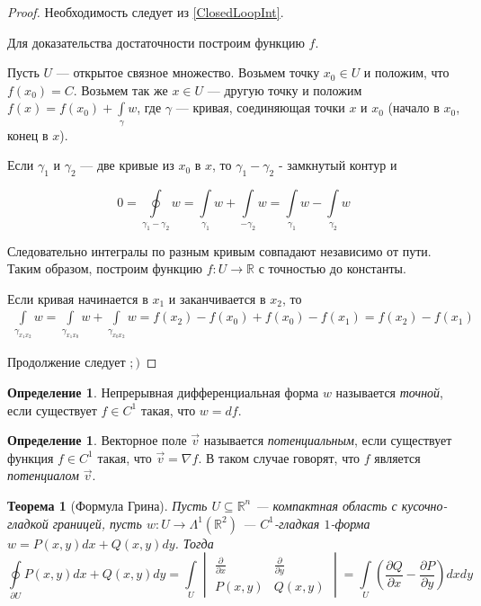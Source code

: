 \documentclass[a5paper]{article}
\newcounter{through}
\theoremstyle{plain}
\newtheorem{theorem}[through]{Теорема}
\theoremstyle{definition}
\newtheorem{definition}[through]{Определение}
\numberwithin{through}{section}
\numberwithin{equation}{section}
\begin{document}
\begin{proof}
	Необходимость следует из \ref{ClosedLoopInt}.
	
	Для доказательства достаточности построим функцию $f$. 
	
	Пусть $U$ --- открытое связное множество. Возьмем точку $x_0 \in U$ и положим, что $f(x_0)=C$. Возьмем так же $x \in U$ --- другую точку и положим $f(x)=f(x_0)+\int\limits_{\gamma} w$, где $\gamma$ --- кривая, соединяющая точки $x$ и $x_0$ (начало в $x_0$, конец в $x$). 
	
	Если $\gamma_1$ и $\gamma_2$ --- две кривые из $x_0$ в $x$, то $\gamma_1 - \gamma_2$ - замкнутый контур и 
	
	\begin{equation*}
		0 = \oint\limits_{\gamma_1 - \gamma_2}w = \int\limits_{\gamma_1} w + \int\limits_{-\gamma_2} w = \int\limits_{\gamma_1} w - \int\limits_{\gamma_2} w
	\end{equation*}
	
	Следовательно интегралы по разным кривым совпадают независимо от пути. Таким образом, построим
	функцию $f: U \to \mathbb{R}$ с точностью до константы.
	
	Если кривая начинается в $x_1$ и заканчивается в $x_2$, то
	\begin{eqnarray}\nonumber
		\int\limits_{\gamma_{x_1x_2}} w = \int\limits_{\gamma_{x_1x_0}} w + \int\limits_{\gamma_{x_0x_2}} w 
		= f(x_2)  - f(x_0) + f(x_0) - f(x_1)= f(x_2) - f(x_1)
	\end{eqnarray}
	
	Продолжение следует $;)$
\end{proof}


\begin{definition}
	Непрерывная дифференциальная форма $w$ называется \textit{точной}, если существует
	$f \in C^1$ такая, что $ w = df$.
\end{definition}

\begin{definition}
	Векторное поле $\vec{v}$ называется \textit{потенциальным}, если существует функция $f \in C^1$ 
	такая, что $\vec{v} = \nabla f$. В таком случае говорят, что $f$ является \textit{потенциалом}
	$\vec{v}$.
\end{definition}


\begin{theorem}[Формула Грина]
	Пусть $U \subseteq \mathbb{R}^n$ --- компактная область с кусочно-гладкой границей,
	пусть $w: U \to \Lambda^1(\mathbb{R}^2)$ --- $C^1$-гладкая $1$-форма $w = P(x,y)dx + Q(x,y)dy$. Тогда 
	\[ \oint\limits_{\partial U} P(x,y)dx + Q(x,y)dy = \int\limits_{U} 
	\begin{vmatrix}
	\frac{\partial}{\partial x} & \frac{\partial}{\partial y} \\
	P(x,y) & Q(x,y)
	\end{vmatrix} 
	= \int\limits_{U} \left(\frac{\partial Q}{\partial x} - \frac{\partial P}{\partial y} \right)dxdy \]
\end{theorem}
\end{document}
